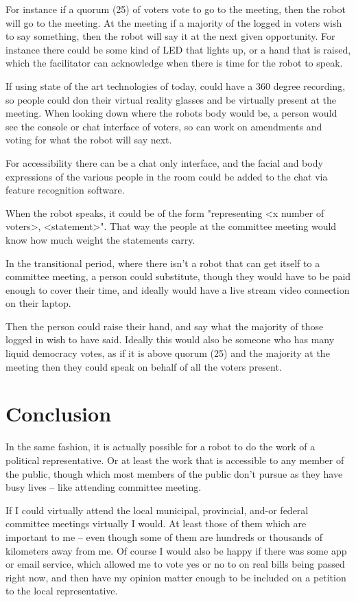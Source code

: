 \documentclass{report}
\begin{document}
For instance if a quorum (25) of voters vote to go to the meeting, then the robot will go to the meeting.  At the meeting if a majority of the logged in voters wish to say something, then the robot will say it at the next given opportunity.  For instance there could be some kind of LED that lights up, or a hand that is raised, which the facilitator can acknowledge when there is time for the robot to speak.

If using state of the art technologies of today, could have a 360 degree recording, so people could don their virtual reality glasses and be virtually present at the meeting. When looking down where the robots body would be, a person would see the console or chat interface of voters, so can work on amendments and voting for what the robot will say next.

For accessibility there can be a chat only interface, and the facial and body expressions of the various people in the room could be added to the chat via feature recognition software.


When the robot speaks, it could be of the form "representing <x number of voters>, <statement>". That way the people at the committee meeting would know how much weight the statements carry.

In the transitional period, where there isn't a robot that can get itself to a committee meeting, a person could substitute,  though they would have to be paid enough to cover their time, and ideally would have a live stream video connection on their laptop.

Then the person could raise their hand, and say what the majority of those logged in wish to have said.
Ideally this would also be someone who has many liquid democracy votes, as if it is above quorum (25) and the majority at the meeting then they could speak on behalf of all the voters present.

\section{Conclusion}

In the same fashion, it is actually possible for a robot to do the work of a political representative.  Or at least the work that is accessible to any member of the public, though which most members of the public don't pursue as they have busy lives -- like attending committee meeting.

If I could virtually attend the local municipal, provincial, and-or federal committee meetings virtually I would. At least those of them which are important to me -- even though some of them are hundreds or thousands of kilometers away from me.  Of course I would also be happy if there was some app or email service, which allowed me to vote yes or no to on real bills being passed right now, and then have my opinion matter enough to be included on a petition to the local representative.
\end{document}
